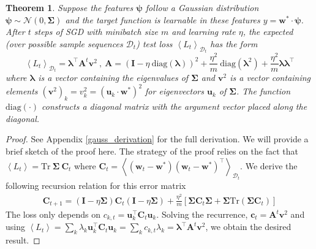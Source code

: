 \documentclass{article} %
\def\w{\bm w}
\newtheorem{theorem}{Theorem}
\def\w{\mathbf w}
\def\bSigma{\mathbf \Sigma}
\def\A{\mathbf A}
\def\D{\mathcal D}
\def\u{\mathbf u}
\def\I{\mathbf I}
\def\C{\mathbf C}
\begin{document}
\begin{theorem}\label{th_gauss}
Suppose the features $\bm\psi$ follow a Gaussian distribution $\bm\psi \sim \mathcal N(0, \bSigma)$ and the target function is learnable in these features $y = \w^* \cdot \bm\psi$. After $t$ steps of SGD with minibatch size $m$ and learning rate $\eta$, the expected (over possible sample sequences $\D_t$) test loss $\left< L_t \right>_{\mathcal D_t}$ has the form
\begin{equation}
    \left< L_t \right>_{\D_t} = \bm\lambda^\top \mathbf A^t \mathbf{v}^2 \ , \ \A =  \left( \I - \eta \ \text{diag}(\bm\lambda) \right)^2 + \frac{\eta^2}{m} \ \text{diag}\left( \bm\lambda^2 \right) + \frac{\eta^2}{m} \bm\lambda \bm\lambda^\top
\end{equation}
%
where $\bm\lambda$ is a vector containing the eigenvalues of $\bSigma$ and $\mathbf{v}^2$ is a vector containing elements $(\mathbf{v}^2)_k = v_k^2 = ( \u_k \cdot \w^*)^2$ for eigenvectors $\u_k$ of $\bSigma$. The function $\text{diag}(\cdot)$ constructs a diagonal matrix with the argument vector placed along the diagonal.  
\end{theorem}
\begin{proof}
See Appendix \ref{gauss_derivation} for the full derivation. We will provide a brief sketch of the proof here. The strategy of the proof relies on the fact that $\left< L_t \right> = \text{Tr} \ \bm\Sigma \ \C_t$ where $\C_t = \left< \left( \w_t - \w^* \right)(\w_t-\w^*)^\top \right>_{\mathcal D_t}$. We derive the following recursion relation for this error matrix
\begin{align}
    \C_{t+1} = (\I - \eta \bm\Sigma) \C_t (\I -\eta \bm\Sigma) + \frac{\eta^2}{m}\left[ \bm\Sigma \C_t \bm\Sigma + \bm\Sigma \text{Tr}\left( \bm\Sigma  \C_t \right) \right]
\end{align}
The loss only depends on $c_{k,t} = \u_k^\top \C_t \u_k$. Solving the recurrence, $\bm c_{t} = \A^t \mathbf{v}^2$ and using $\left< L_t \right> = \sum_k \lambda_k \u_k^\top \C_t \u_k = \sum_k c_{k,t} \lambda_k = \bm\lambda^\top \A^t \mathbf{v}^2$, we obtain the desired result.
\end{proof}
\end{document}
